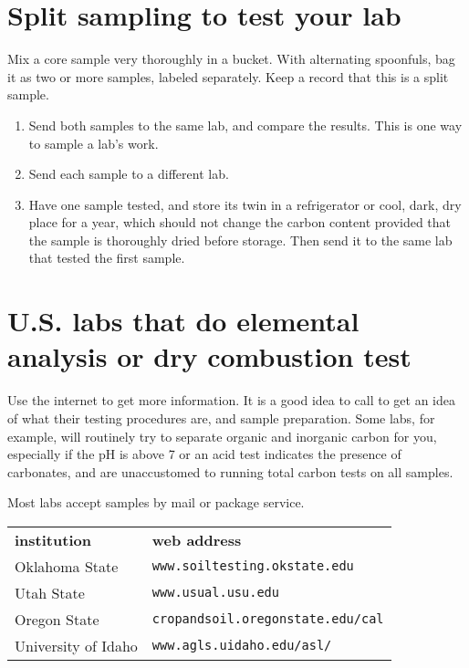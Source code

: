 \documentclass[11pt,letterpaper,oneside,onecolumn]{memoir}
\begin{document}
\section{Split sampling to test your lab}

Mix a core sample very thoroughly in a bucket. With alternating spoonfuls, bag it as two or more samples, labeled separately. Keep a record that this is a split sample.

\begin{enumerate}

\item Send both samples to the same lab, and compare the results. This is one way to sample a lab's work.

\item Send each sample to a different lab.

\item Have one sample tested, and store its twin in a refrigerator or cool, dark, dry place for a year, which should not change the carbon content provided that the sample is thoroughly dried before storage. Then send it to the same lab that tested the first sample.

\end{enumerate}

\section{U.S. labs that do elemental analysis or dry combustion test\label{soil labs}}

Use the internet to get more information. It is a good idea to call to get an idea of what their testing procedures are, and sample preparation. Some labs, for example, will routinely try to separate organic and inorganic carbon for you, especially if the pH is above 7 or an acid test indicates the presence of carbonates, and are unaccustomed to running total carbon tests on all samples.

Most labs accept samples by mail or package service.

\begin{tabular}{ll}
\textbf{institution}&\textbf{web address}\\
Oklahoma State&\texttt{www.soiltesting.okstate.edu}\\
Utah State&\texttt{www.usual.usu.edu}\\
Oregon State&\texttt{cropandsoil.oregonstate.edu/cal}\\
University of Idaho&\texttt{www.agls.uidaho.edu/asl/}\\
\end{tabular}
\end{document}
